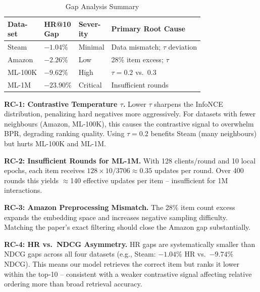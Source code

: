 \documentclass[10pt,twocolumn]{article}
\begin{document}
\begin{table}[H]
\centering
\caption{Gap Analysis Summary}
\label{tab:gap_analysis}
\setlength{\tabcolsep}{3pt}
\footnotesize
\begin{tabular}{llll}
\toprule
\makecell[l]{\textbf{Data-}\\\textbf{set}}
  & \makecell[l]{\textbf{HR@10}\\\textbf{Gap}}
  & \makecell[l]{\textbf{Sever-}\\\textbf{ity}}
  & \textbf{Primary Root Cause} \\
\midrule
Steam   & $-1.04\%$  & Minimal  & Data mismatch; $\tau$ deviation \\
Amazon  & $-2.26\%$  & Low      & 28\% item excess; $\tau$ \\
ML-100K & $-9.62\%$  & High     & $\tau{=}0.2$ vs.\ $0.3$ \\
ML-1M   & $-23.90\%$ & Critical & Insufficient rounds \\
\bottomrule
\end{tabular}
\end{table}

\noindent\textbf{RC-1: Contrastive Temperature $\tau$.}
Lower $\tau$ sharpens the InfoNCE distribution, penalizing hard negatives
more aggressively. For datasets with fewer neighbours (Amazon, ML-100K),
this causes the contrastive signal to overwhelm BPR, degrading ranking
quality. Using $\tau{=}0.2$ benefits Steam (many neighbours) but hurts
ML-100K and ML-1M.

\noindent\textbf{RC-2: Insufficient Rounds for ML-1M.}
With 128 clients/round and 10 local epochs, each item receives
$128 \times 10 / 3706 \approx 0.35$ updates per round. Over 400 rounds
this yields $\approx$140 effective updates per item -- insufficient for
1M interactions.

\noindent\textbf{RC-3: Amazon Preprocessing Mismatch.}
The 28\% item count excess expands the embedding space and increases
negative sampling difficulty. Matching the paper's exact filtering
should close the Amazon gap substantially.

\noindent\textbf{RC-4: HR vs.\ NDCG Asymmetry.}
HR gaps are systematically smaller than NDCG gaps across all four
datasets (e.g., Steam: $-1.04\%$ HR vs.\ $-9.74\%$ NDCG). This means
our model retrieves the correct item but ranks it lower within the
top-10 -- consistent with a weaker contrastive signal affecting relative
ordering more than broad retrieval accuracy.

\end{document}
